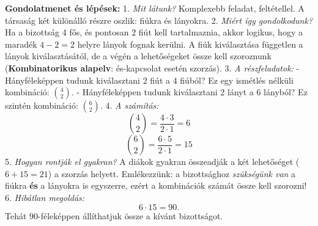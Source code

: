 \documentclass[a4paper,12pt]{article}
\theoremstyle{definition} %
\begin{document}
\textbf{Gondolatmenet és lépések:}
1. \textit{Mit látunk?} Komplexebb feladat, feltétellel. A társaság két különálló részre oszlik: fiúkra és lányokra.
2. \textit{Miért így gondolkodunk?} Ha a bizottság 4 fős, és pontosan 2 fiút kell tartalmaznia, akkor logikus, hogy a maradék $4 - 2 = 2$ helyre lányok fognak kerülni. A fiúk kiválasztása független a lányok kiválasztásától, de a végén a lehetőségeket össze kell szoroznunk (\textbf{Kombinatorikus alapelv}: és-kapcsolat esetén szorzás).
3. \textit{A részfeladatok:}
   - Hányféleképpen tudunk kiválasztani 2 fiút a 4 fiúból? Ez egy ismétlés nélküli kombináció: $\binom{4}{2}$.
   - Hányféleképpen tudunk kiválasztani 2 lányt a 6 lányból? Ez szintén kombináció: $\binom{6}{2}$.
4. \textit{A számítás:}
   $$\binom{4}{2} = \frac{4 \cdot 3}{2 \cdot 1} = 6$$
   $$\binom{6}{2} = \frac{6 \cdot 5}{2 \cdot 1} = 15$$
5. \textit{Hogyan rontják el gyakran?} A diákok gyakran összeadják a két lehetőséget ($6 + 15 = 21$) a szorzás helyett. Emlékezzünk: a bizottsághoz \textit{szükségünk van} a fiúkra \textbf{és} a lányokra is egyszerre, ezért a kombinációk számát össze kell szorozni!
6. \textit{Hibátlan megoldás:}
   $$6 \cdot 15 = 90.$$
   Tehát $90$-féleképpen állíthatjuk össze a kívánt bizottságot.
\end{document}
